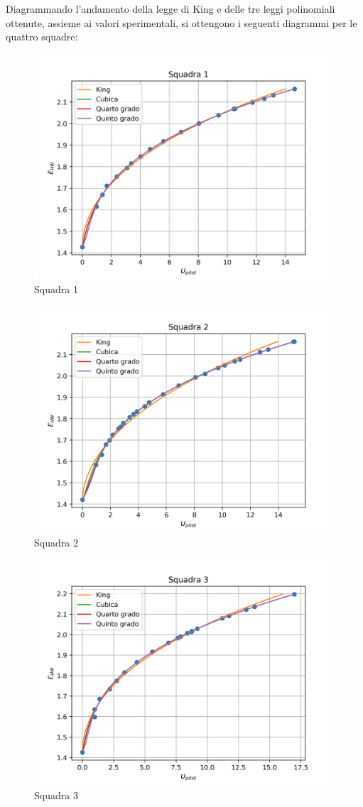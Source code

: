 \newpage
\noindent Diagrammando l'andamento della legge di King e delle tre leggi polinomiali ottenute, assieme ai valori sperimentali, si ottengono i seguenti diagrammi per le quattro squadre:
\begin{figure}[H]
    \centering
    \includegraphics[width=.8\textwidth]{images/8/sq1.png}
    \caption{Squadra 1}
\end{figure}
\begin{figure}[H]
    \centering
    \includegraphics[width=.8\textwidth]{images/8/sq2.png}
    \caption{Squadra 2}
\end{figure}
\begin{figure}[H]
    \centering
    \includegraphics[width=.8\textwidth]{images/8/sq3.png}
    \caption{Squadra 3}
\end{figure}
